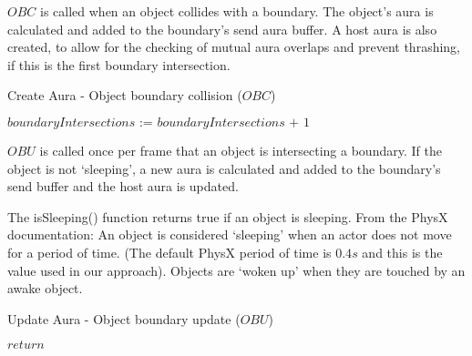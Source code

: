 $OBC$ is called when an object collides with a boundary. The object's aura is calculated and added to the boundary's send aura buffer. A host aura is also created, to allow for the checking of mutual aura overlaps and prevent thrashing, if this is the first boundary intersection.

\begin{algorithm}
	\caption{Create Aura - Object boundary collision ($OBC$)}\label{createAuraBoundaryAlgorithm}
	\begin{algorithmic}[1]
		\State {}
		\State
		\State {}
		\EndIf
		\State $\textit{boundaryIntersections := boundaryIntersections + 1}$
		\EndProcedure
	\end{algorithmic}
\end{algorithm}

$OBU$ is called once per frame that an object is intersecting a boundary. If the object is not `sleeping', a new aura is calculated and added to the boundary's send buffer and the host aura is updated.

The isSleeping() function returns true if an object is sleeping. From the PhysX documentation:
An object is considered `sleeping' when an actor does not move for a period of time. (The default PhysX period of time is $0.4s$ and this is the value used in our approach). Objects are `woken up' when they are touched by an awake object. 

\begin{algorithm}
	\caption{Update Aura - Object boundary update ($OBU$)}\label{objectWithAuraAlgorithm}
	\begin{algorithmic}[1]
		\State $\textit{return}$
		\EndIf
		\State {} 
		\State {}
		\EndProcedure
	\end{algorithmic}
\end{algorithm}

